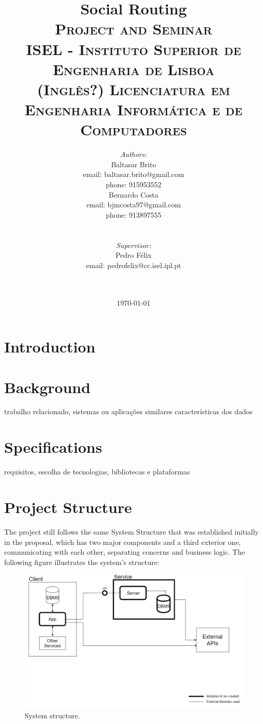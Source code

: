 \documentclass{article}
\title{
    \vspace{-4.0cm}
    {\Huge Social Routing}\\[0.5cm]    
    \textsc{\Large Project and Seminar}\\[0.5cm]
    \textsc{\large ISEL - Instituto Superior de Engenharia de Lisboa}\\[0.5cm]
    \textsc{\large (Inglês?) Licenciatura em Engenharia Informática e de Computadores}\\[0.5cm]
}
\date{\today}
\author{   
    \begin{minipage}{0.4\textwidth}
        \begin{flushleft} \large
        \emph{Authors:}\\
        Baltasar Brito\\
        {\small email: baltasar.brito@gmail.com}\\
        {\small phone: 915953552}\\
        Bernardo Costa\\
        {\small email: bjmcosta97@gmail.com}\\
        {\small phone: 913897555}\\
        \end{flushleft}
    \end{minipage}
    ~
    \begin{minipage}{0.4\textwidth}
        \begin{flushright} \large
        \emph{Supervisor:} \\ 
        Pedro Félix\\
        {\small email: pedrofelix@cc.isel.ipl.pt}\\  
        \end{flushright}
    \end{minipage}\\[2cm]  
}
\begin{document}
     
    
    \maketitle

    \newpage

    \tableofcontents

    \newpage

    \section{Introduction}

    \section{Background}
    trabalho relacionado, sistemas ou aplicações similares
    características dos dados

    \section{Specifications}
    requisitos, escolha de tecnologias, bibliotecas e plataformas

    \section{Project Structure}
        The project still follows the same System Structure that was established initially in the proposal, which has two major components and a 
        third exterior one, communicating with each other, separating concerns and business logic. The following figure illustrates the system's structure:
        
        \begin{figure}[h]            
            \includegraphics[width=\textwidth]{images/project-structure/system-structure.PNG}
            \caption{System structure.}
            \label{fig:systemstructure}
        \end{figure}  
    \newpage    
\end{document}
